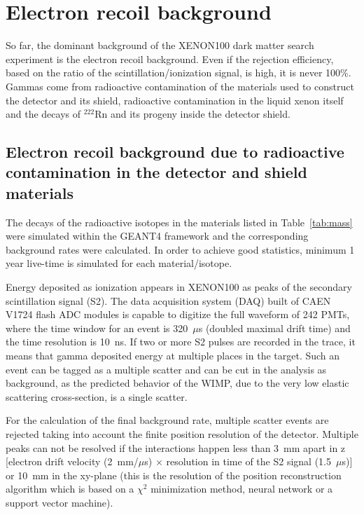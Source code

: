 \section{Electron recoil background}
\label{sec:gammas}

So far, the dominant background of the XENON100 dark matter search experiment is the electron recoil background. Even if the rejection efficiency, based on the ratio of the
scintillation/ionization signal, is high, it is never 100\%. 
Gammas come from radioactive contamination of the materials used
to construct the detector and its shield, radioactive contamination in the liquid xenon itself
and the decays of ${^{222}}$Rn and its progeny inside the detector shield.

\subsection{Electron recoil background due to radioactive contamination in the detector and shield materials}
\label{sec:gammas_Materials}

The decays of the radioactive isotopes in the materials listed in Table~\ref{tab:mass}
were simulated within the GEANT4 framework and the corresponding background rates were calculated. In order to achieve good statistics, minimum 1 year live-time is simulated for each material/isotope.

Energy deposited as ionization appears in XENON100 as peaks of the
secondary scintillation signal (S2). The data acquisition system (DAQ) built of CAEN V1724 flash ADC modules is capable to digitize the full waveform of 242 PMTs, where the time window for an event is 320~$\mu$s (doubled maximal drift time) and the time resolution is 10~ns. 
If two or more S2 pulses are recorded in the trace, it means
that gamma deposited energy at multiple places in the target. Such an event can
be tagged as a multiple scatter and can be cut in the analysis as background, as the
predicted behavior of the WIMP, due to the very low elastic scattering cross-section, is a single scatter.

For the calculation of the final background rate, multiple scatter events are
rejected taking into account the finite position resolution of the detector.  
Multiple peaks can not be resolved if the interactions happen less than 3~mm apart in z [electron
drift velocity (2~mm/$\mu$s) $\times$ resolution in time of the S2 signal
(1.5~$\mu$s)] or 10~mm in the xy-plane (this is the resolution of the position
reconstruction algorithm which is based on a $\chi$$^{2}$ minimization method, neural network or a support vector machine).

